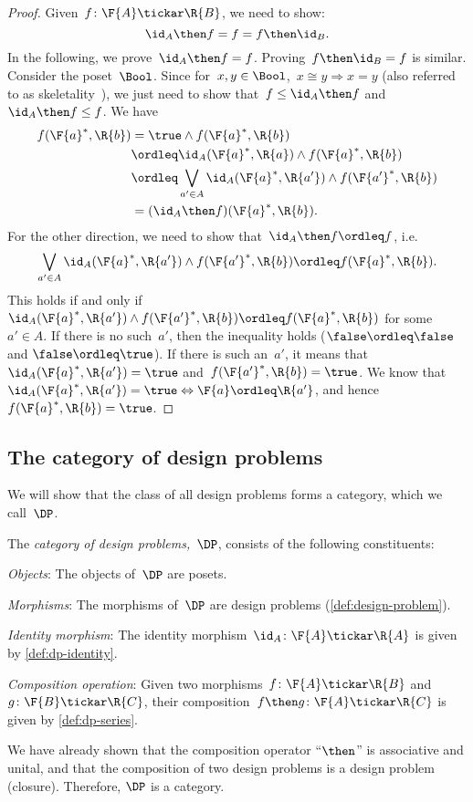 \begin{proof}
Given~$f\colon \F{A}\tickar \R{B}$, we need to show:
\begin{equation}
    \id_A \then f= f = f\then \id_B.
\end{equation}
In the following, we prove~$\id_A \then f = f$. Proving~$f\then \id_B=f$ is similar.
Consider the poset~$\Bool$. Since for~$x,y\in \Bool$,~$x\cong y \Rightarrow x=y$ (also referred to as skeletality~\cite{fong2019}), we just need to show that~$f\leq \id_A\then f$ and~$\id_A\then f\leq f$.
We have
\begin{equation}
\begin{aligned}
        f(\F{a}^*,\R{b})&=\true \wedge f(\F{a}^*,\R{b})\\
        &\ordleq \id_A(\F{a}^*,\R{a}) \wedge f(\F{a}^*,\R{b})\\
        &\ordleq \bigvee_{a'\in A}\id_A(\F{a}^*,\R{a'})\wedge f(\F{a'}^*,\R{b})\\
        &=(\id_A\then f)(\F{a}^*,\R{b}).
\end{aligned}
\end{equation}
For the other direction, we need to show that~$\id_A\then f\ordleq f$, i.e.
\begin{equation}
    \bigvee_{a'\in A}\id_A(\F{a}^*,\R{a'})\wedge f(\F{a'}^*,\R{b}) \ordleq f(\F{a}^*,\R{b}).
\end{equation}
This holds if and only if~$\id_A(\F{a}^*,\R{a'})\wedge f(\F{a'}^*,\R{b}) \ordleq f(\F{a}^*,\R{b})$ for some~$a'\in A$. If there is no such~$a'$, then the inequality holds ($\false \ordleq \false$ and $\false \ordleq \true$). If there is such an~$a'$, it means that~$\id_A(\F{a}^*,\R{a'})=\true$ and~$f(\F{a'}^*,\R{b})=\true$. We know that~$\id_A(\F{a}^*,\R{a'})=\true \Leftrightarrow \F{a}\ordleq \R{a'}$, and hence~$f(\F{a}^*,\R{b})=\true$.
\end{proof}

\subsection{The category of design problems}

We will show that the class of all design problems forms a category, which we call~$\DP$.

\begin{definition}[Category $\DP$]
\label{define:DP}
The \emph{category of design problems,~$\DP$}, consists of the following constituents:
%
\begin{compactenum}
\item \emph{Objects}: The objects of~$\DP$ are posets.
\item \emph{Morphisms}: The morphisms of~$\DP$ are design problems (\cref{def:design-problem}).
\item \emph{Identity morphism}: The identity morphism~$\id_A \colon \F{A} \tickar \R{A}$ is given by \cref{def:dp-identity}.
\item \emph{Composition operation}: Given two morphisms~$f \colon  \F{A} \tickar \R{B}$ and~$g \colon \F{B} \tickar \R{C}$, their
composition~$f\then g\colon  \F{A} \tickar \R{C}$ is
given by \cref{def:dp-series}.
\end{compactenum}
\end{definition}

We have already shown that the composition operator ``$\then$'' is associative and unital, and that the composition of two design problems is a design problem (closure). Therefore, $\DP$ is a category.